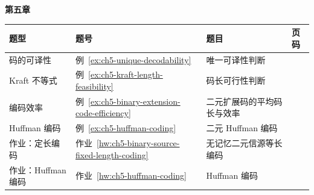 {\noindent\textbf{第五章}\par
\begin{tabularx}{\textwidth}{@{}p{}p{}>{\raggedright\arraybackslash}X>{\raggedleft\arraybackslash}p{}@{}}
\toprule
\textbf{题型} & \textbf{题号} & \textbf{题目} & \textbf{页码} \\
\midrule
码的可译性 & 例~\ref{ex:ch5-unique-decodability} & 唯一可译性判断 & \hyperref[ex:ch5-unique-decodability]{\pageref*{ex:ch5-unique-decodability}}  \\
Kraft 不等式 & 例~\ref{ex:ch5-kraft-length-feasibility} & 码长可行性判断 & \hyperref[ex:ch5-kraft-length-feasibility]{\pageref*{ex:ch5-kraft-length-feasibility}}  \\
编码效率 & 例~\ref{ex:ch5-binary-extension-code-efficiency} & 二元扩展码的平均码长与效率 & \hyperref[ex:ch5-binary-extension-code-efficiency]{\pageref*{ex:ch5-binary-extension-code-efficiency}}  \\
Huffman 编码 & 例~\ref{ex:ch5-huffman-coding} & 二元 Huffman 编码 & \hyperref[ex:ch5-huffman-coding]{\pageref*{ex:ch5-huffman-coding}}  \\
作业：定长编码 & 作业~\ref{hw:ch5-binary-source-fixed-length-coding} & 无记忆二元信源等长编码 & \hyperref[hw:ch5-binary-source-fixed-length-coding]{\pageref*{hw:ch5-binary-source-fixed-length-coding}}  \\
作业：Huffman 编码 & 作业~\ref{hw:ch5-huffman-coding} & Huffman 编码 & \hyperref[hw:ch5-huffman-coding]{\pageref*{hw:ch5-huffman-coding}}  \\
\bottomrule
\end{tabularx}

}
